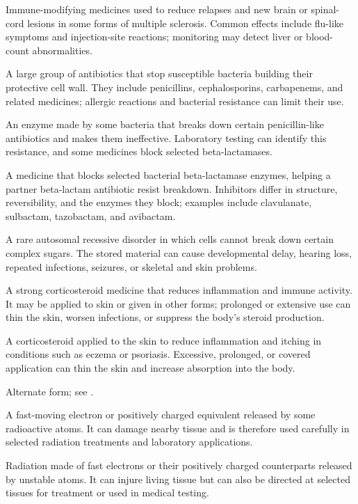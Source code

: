 Immune-modifying medicines used to reduce relapses and new brain or spinal-cord lesions in some forms of multiple sclerosis. Common effects include flu-like symptoms and injection-site reactions; monitoring may detect liver or blood-count abnormalities.

 A large group of antibiotics that stop susceptible bacteria building their protective cell wall. They include penicillins, cephalosporins, carbapenems, and related medicines; allergic reactions and bacterial resistance can limit their use.

 An enzyme made by some bacteria that breaks down certain penicillin-like antibiotics and makes them ineffective. Laboratory testing can identify this resistance, and some medicines block selected beta-lactamases.

 A medicine that blocks selected bacterial beta-lactamase enzymes, helping a partner beta-lactam antibiotic resist breakdown. Inhibitors differ in structure, reversibility, and the enzymes they block; examples include clavulanate, sulbactam, tazobactam, and avibactam.

 A rare autosomal recessive disorder in which cells cannot break down certain complex sugars. The stored material can cause developmental delay, hearing loss, repeated infections, seizures, or skeletal and skin problems.

 A strong corticosteroid medicine that reduces inflammation and immune activity. It may be applied to skin or given in other forms; prolonged or extensive use can thin the skin, worsen infections, or suppress the body's steroid production.

 A corticosteroid applied to the skin to reduce inflammation and itching in conditions such as eczema or psoriasis. Excessive, prolonged, or covered application can thin the skin and increase absorption into the body.

 Alternate form; see .

 A fast-moving electron or positively charged equivalent released by some radioactive atoms. It can damage nearby tissue and is therefore used carefully in selected radiation treatments and laboratory applications.

 Radiation made of fast electrons or their positively charged counterparts released by unstable atoms. It can injure living tissue but can also be directed at selected tissues for treatment or used in medical testing.

